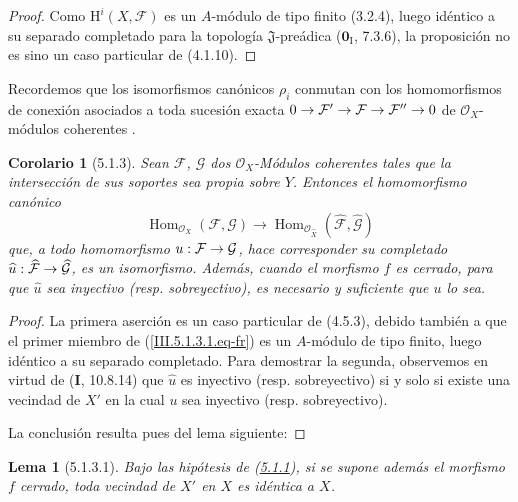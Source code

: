 \documentclass[10pt,oneside,openany]{book}
\theoremstyle{egaenv}\newtheorem*{env}{---}
\theoremstyle{egastatement}
\newtheorem*{lemma}{Lema}
\newtheorem*{corollary}{Corolario}
\theoremstyle{egadescription}
\newcommand{\oldpage}[2][]{\marginnote{\normalfont\scriptsize\textbf{#1}\,|\,#2}\ignorespaces}
\renewcommand{\to}{\mathchoice{\longrightarrow}{\rightarrow}{\rightarrow}{\rightarrow}}
\begin{document}
\begin{proof}
Como $\mathrm H^i(X,\mathcal F)$ es un $A$-módulo de tipo finito (3.2.4), luego
idéntico a su separado completado para la topología $\mathfrak J$-preádica
($\mathbf{0}_{\mathrm I}$, 7.3.6), la proposición no es sino un caso particular de (4.1.10).
\end{proof}

Recordemos que los isomorfismos canónicos $\rho_i$ conmutan con los
homomorfismos de conexión asociados a toda sucesión exacta
$0\to\mathcal F'\to\mathcal F\to\mathcal F''\to0$
de $\mathcal O_X$-módulos coherentes
 .

\begin{corollary}[5.1.3]
\label{III.5.1.3-fr}
Sean $\mathcal F$, $\mathcal G$ dos $\mathcal O_X$-Módulos coherentes tales que
la intersección de sus soportes sea propia sobre $Y$. Entonces el homomorfismo canónico
\begin{equation}
\operatorname{Hom}_{\mathcal O_X}(\mathcal F,\mathcal G)
\longrightarrow
\operatorname{Hom}_{\mathcal O_{\widehat X}}
(\widehat{\mathcal F},\widehat{\mathcal G})
\tag{5.1.3.1}
\label{III.5.1.3.1.eq-fr}
\end{equation}
que, a todo homomorfismo $u:\mathcal F\to\mathcal G$, hace corresponder su
completado $\widehat u:\widehat{\mathcal F}\to\widehat{\mathcal G}$, es un
isomorfismo. Además, cuando el morfismo $f$ es cerrado, para que $\widehat u$ sea
inyectivo (\textup{resp.} sobreyectivo), es necesario y suficiente que $u$ lo sea.
\end{corollary}

\begin{proof}
La primera aserción es un caso particular de (4.5.3), debido también a que el
primer miembro de (\ref{III.5.1.3.1.eq-fr}) es un $A$-módulo de tipo finito, luego
idéntico a su separado completado. Para demostrar la segunda, observemos en virtud de
(\textbf{I}, 10.8.14) que $\widehat u$ es inyectivo (resp. sobreyectivo) si y solo si existe
una vecindad de $X'$ en la cual $u$ sea inyectivo (resp. sobreyectivo).

\oldpage[III]{150}
La conclusión
resulta pues del lema siguiente:
\end{proof}

\begin{lemma}[5.1.3.1]
\label{III.5.1.3.1-fr}
Bajo las hipótesis de \textup{(\hyperref[III.5.1.1-fr]{5.1.1})}, si se supone además el
morfismo $f$ cerrado, toda vecindad de $X'$ en $X$ es idéntica a $X$.
\end{lemma}
\end{document}
